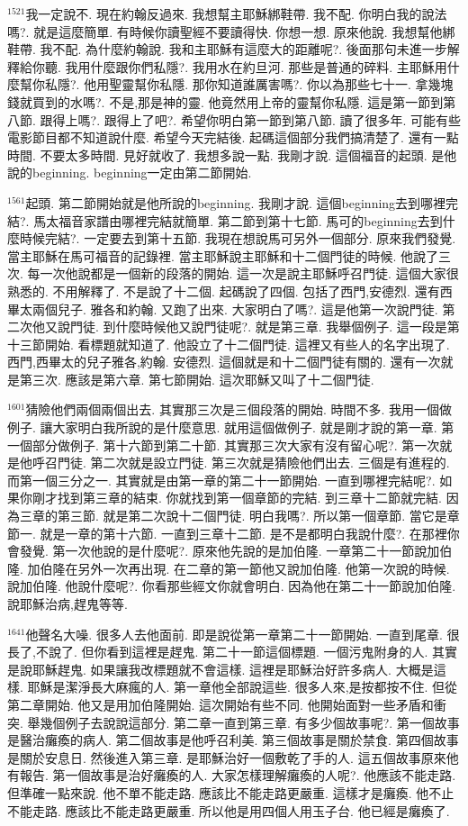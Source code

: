 \documentclass{book}
\begin{document}
$^{1521}$我一定說不.
現在約翰反過來.
我想幫主耶穌綁鞋帶.
我不配.
你明白我的說法嗎?.
就是這麼簡單.
有時候你讀聖經不要讀得快.
你想一想.
原來他說.
我想幫他綁鞋帶.
我不配.
為什麼約翰說.
我和主耶穌有這麼大的距離呢?.
後面那句未進一步解釋給你聽.
我用什麼跟你們私隱?.
我用水在約旦河.
那些是普通的碎料.
主耶穌用什麼幫你私隱?.
他用聖靈幫你私隱.
那你知道誰厲害嗎?.
你以為那些七十一.
拿幾塊錢就買到的水嗎?.
不是,那是神的靈.
他竟然用上帝的靈幫你私隱.
這是第一節到第八節.
跟得上嗎?.
跟得上了吧?.
希望你明白第一節到第八節.
讀了很多年.
可能有些電影節目都不知道說什麼.
希望今天完結後.
起碼這個部分我們搞清楚了.
還有一點時間.
不要太多時間.
見好就收了.
我想多說一點.
我剛才說.
這個福音的起頭.
是他說的beginning.
beginning一定由第二節開始.

$^{1561}$起頭.
第二節開始就是他所說的beginning.
我剛才說.
這個beginning去到哪裡完結?.
馬太福音家譜由哪裡完結就簡單.
第二節到第十七節.
馬可的beginning去到什麼時候完結?.
一定要去到第十五節.
我現在想說馬可另外一個部分.
原來我們發覺.
當主耶穌在馬可福音的記錄裡.
當主耶穌說主耶穌和十二個門徒的時候.
他說了三次.
每一次他說都是一個新的段落的開始.
這一次是說主耶穌呼召門徒.
這個大家很熟悉的.
不用解釋了.
不是說了十二個.
起碼說了四個.
包括了西門,安德烈.
還有西畢太兩個兒子.
雅各和約翰.
又跑了出來.
大家明白了嗎?.
這是他第一次說門徒.
第二次他又說門徒.
到什麼時候他又說門徒呢?.
就是第三章.
我舉個例子.
這一段是第十三節開始.
看標題就知道了.
他設立了十二個門徒.
這裡又有些人的名字出現了.
西門,西畢太的兒子雅各,約翰.
安德烈.
這個就是和十二個門徒有關的.
還有一次就是第三次.
應該是第六章.
第七節開始.
這次耶穌又叫了十二個門徒.

$^{1601}$猜險他們兩個兩個出去.
其實那三次是三個段落的開始.
時間不多.
我用一個做例子.
讓大家明白我所說的是什麼意思.
就用這個做例子.
就是剛才說的第一章.
第一個部分做例子.
第十六節到第二十節.
其實那三次大家有沒有留心呢?.
第一次就是他呼召門徒.
第二次就是設立門徒.
第三次就是猜險他們出去.
三個是有進程的.
而第一個三分之一.
其實就是由第一章的第二十一節開始.
一直到哪裡完結呢?.
如果你剛才找到第三章的結束.
你就找到第一個章節的完結.
到三章十二節就完結.
因為三章的第三節.
就是第二次說十二個門徒.
明白我嗎?.
所以第一個章節.
當它是章節一.
就是一章的第十六節.
一直到三章十二節.
是不是都明白我說什麼?.
在那裡你會發覺.
第一次他說的是什麼呢?.
原來他先說的是加伯隆.
一章第二十一節說加伯隆.
加伯隆在另外一次再出現.
在二章的第一節他又說加伯隆.
他第一次說的時候.
說加伯隆.
他說什麼呢?.
你看那些經文你就會明白.
因為他在第二十一節說加伯隆.
說耶穌治病,趕鬼等等.

$^{1641}$他聲名大噪.
很多人去他面前.
即是說從第一章第二十一節開始.
一直到尾章.
很長了,不說了.
但你看到這裡是趕鬼.
第二十一節這個標題.
一個污鬼附身的人.
其實是說耶穌趕鬼.
如果讓我改標題就不會這樣.
這裡是耶穌治好許多病人.
大概是這樣.
耶穌是潔淨長大麻瘋的人.
第一章他全部說這些.
很多人來,是按都按不住.
但從第二章開始.
他又是用加伯隆開始.
這次開始有些不同.
他開始面對一些矛盾和衝突.
舉幾個例子去說說這部分.
第二章一直到第三章.
有多少個故事呢?.
第一個故事是醫治癱瘓的病人.
第二個故事是他呼召利美.
第三個故事是關於禁食.
第四個故事是關於安息日.
然後進入第三章.
是耶穌治好一個敷乾了手的人.
這五個故事原來他有報告.
第一個故事是治好癱瘓的人.
大家怎樣理解癱瘓的人呢?.
他應該不能走路.
但準確一點來說.
他不單不能走路.
應該比不能走路更嚴重.
這樣才是癱瘓.
他不止不能走路.
應該比不能走路更嚴重.
所以他是用四個人用玉子台.
他已經是癱瘓了.
\end{document}

